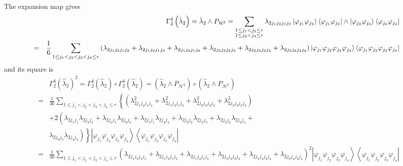 \documentclass[12pt]{article}
\begin{document}
The expansion map gives 
\begin{eqnarray*}
&&\Gamma _{2}^{4}\left( \hat{\lambda}_{2}\right) =\hat{\lambda}_{2}\wedge P_{%
\mathcal{H}^{2}}=\sum_{\substack{ 1\leq j_{1}<j_{2}\leq r  \\ 1\leq
j_{3}<j_{4}\leq r}}\lambda _{2j_{1}j_{2}j_{1}j_{2}}\left\vert \varphi
_{j_{1}}\varphi _{j_{2}}\right\rangle \left\langle \varphi _{j_{1}}\varphi
_{j_{2}}\right\vert \wedge \left\vert \varphi _{j_{3}}\varphi
_{j_{4}}\right\rangle \left\langle \varphi _{j_{3}}\varphi
_{j_{4}}\right\vert \\
&=&\frac{1}{6}\sum_{1\leq j_{1}<j_{2}<j_{3}<j_{4}\leq r}\left( \lambda
_{2j_{1}j_{2}j_{1}j_{2}}+\lambda _{2j_{1}j_{3}j_{1}j_{3}}+\lambda
_{2j_{1}j_{4}j_{1}j_{4}}+\lambda _{2j_{2}j_{3}j_{2}j_{3}}+\lambda
_{2j_{2}j_{4}j_{2}j_{4}}+\lambda _{2j_{3}j_{4}j_{3}j_{4}}\right) \left\vert
\varphi _{j_{1}}\varphi _{j_{2}}\varphi _{j_{3}}\varphi
_{j_{4}}\right\rangle \left\langle \varphi _{j_{1}}\varphi _{j_{2}}\varphi
_{j_{3}}\varphi _{j_{4}}\right\vert
\end{eqnarray*}%
and its square is 
\begin{eqnarray*}
&&\Gamma _{2}^{4}\left( \hat{\lambda}_{2}\right) ^{2}=\Gamma _{2}^{4}\left( 
\hat{\lambda}_{2}\right) \circ \Gamma _{2}^{4}\left( \hat{\lambda}%
_{2}\right) =\left( \hat{\lambda}_{2}\wedge P_{\mathcal{H}^{2}}\right) \circ
\left( \hat{\lambda}_{2}\wedge P_{\mathcal{H}^{2}}\right) \\
&=&\frac{1}{36}\sum_{1\leq j_{1}<j_{2}<j_{3}<j_{4}\leq r}\left\{ \left(
\lambda _{2j_{1}j_{2}j_{1}j_{2}}^{2}+\lambda
_{2j_{1}j_{3}j_{1}j_{3}}^{2}+\lambda _{2j_{2}j_{3}j_{2}j_{3}}^{2}+\lambda
_{2j_{2}j_{3}j_{2}j_{3}}^{2}\right) \right. \\
&&+2\left( \lambda _{2j_{1}j_{1}}\lambda _{2j_{2}j_{2}}+\lambda
_{2j_{1}j_{1}}\lambda _{2j_{3}j_{3}}+\lambda _{2j_{1}j_{1}}\lambda
_{2j_{4}j_{4}}+\lambda _{2j_{2}j_{2}}\lambda _{2j_{3}j_{3}}+\lambda
_{2j_{2}j_{2}}\lambda _{2j_{4}j_{4}}\right. + \\
&&\left. \left. \lambda _{2j_{3}j_{3}}\lambda _{2j_{4}j_{4}}\right) \right\}
\left\vert \varphi _{j_{1}}\varphi _{j_{2}}\varphi _{j_{3}}\varphi
_{j_{4}}\right\rangle \left\langle \varphi _{j_{1}}\varphi _{j_{2}}\varphi
_{j_{3}}\varphi _{j_{4}}\right\vert \\
&=&\frac{1}{36}\sum_{1\leq j_{1}<j_{2}<j_{3}<j_{4}\leq r}\left( \lambda
_{2j_{1}j_{2}j_{1}j_{2}}+\lambda _{2j_{1}j_{3}j_{1}j_{3}}+\lambda
_{2j_{1}j_{4}j_{1}j_{4}}+\lambda _{2j_{2}j_{3}j_{2}j_{3}}+\lambda
_{2j_{2}j_{4}j_{2}j_{4}}+\lambda _{2j_{3}j_{4}j_{3}j_{4}}\right)
^{2}\left\vert \varphi _{j_{1}}\varphi _{j_{2}}\varphi _{j_{3}}\varphi
_{j_{4}}\right\rangle \left\langle \varphi _{j_{1}}\varphi _{j_{2}}\varphi
_{j_{3}}\varphi _{j_{4}}\right\vert
\end{eqnarray*}%
\end{document}
